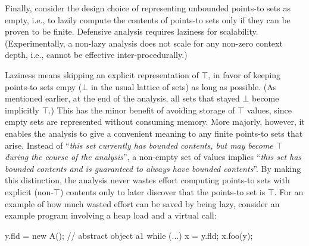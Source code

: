 

Finally, consider the design choice of representing unbounded
points-to sets as empty, i.e., to lazily compute the contents of
points-to sets only if they can be proven to be finite. Defensive
analysis requires laziness for scalability. (Experimentally, a
non-lazy analysis does not scale for any non-zero context depth, i.e.,
cannot be effective inter-procedurally.)

Laziness means skipping an explicit representation of $\top$, in favor
of keeping points-to sets empy ($\bot$ in the usual lattice of sets)
as long as possible. (As mentioned earlier, at the end of the
analysis, all sets that stayed $\bot$ become implicitly $\top$.)  This
has the minor benefit of avoiding storage of $\top$ values, since
empty sets are represented without consuming memory. More majorly,
however, it enables the analysis to give a convenient meaning to any
finite points-to sets that arise. Instead of ``\emph{this set
  currently has bounded contents, but may become $\top$ during the
  course of the analysis}'', a non-empty set of values implies
``\emph{this set has bounded contents and is guaranteed to always have
  bounded contents}''. By making this distinction, the analysis never
wastes effort computing points-to sets with explicit (non-$\top$)
contents only to later discover that the points-to set is $\top$.  For
an example of how much wasted effort can be saved by being lazy,
consider an example program involving a heap load and a virtual call:

\vspace{-3mm}\begin{minipage}[l]{5.1in}
\begin{javacode}
y.fld = new A();  // abstract object a1
while (...) {    
  x = y.fld;
  x.foo(y);
}
\end{javacode}
\end{minipage}

